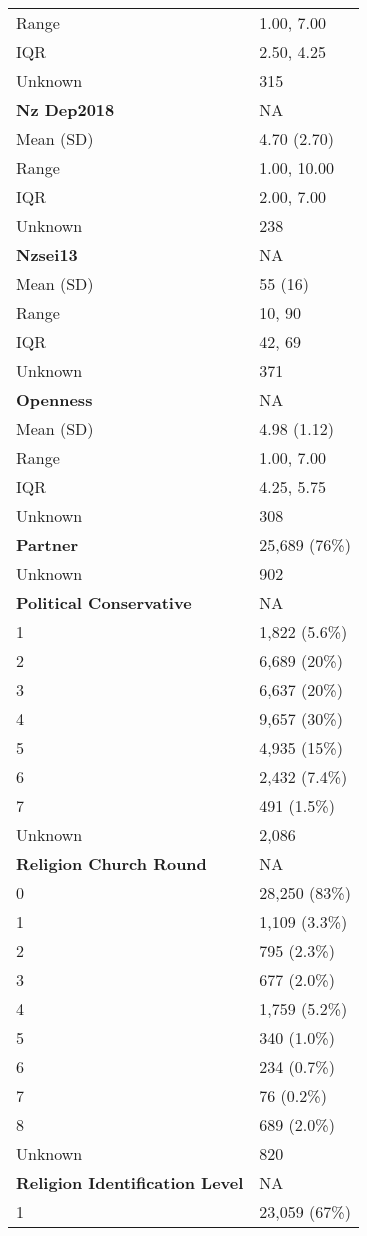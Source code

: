 \documentclass[
  single column]{article}
\begin{document}
\begin{longtable}[]{@{}ll@{}}
Range & 1.00, 7.00 \\
IQR & 2.50, 4.25 \\
Unknown & 315 \\
\textbf{Nz Dep2018} & NA \\
Mean (SD) & 4.70 (2.70) \\
Range & 1.00, 10.00 \\
IQR & 2.00, 7.00 \\
Unknown & 238 \\
\textbf{Nzsei13} & NA \\
Mean (SD) & 55 (16) \\
Range & 10, 90 \\
IQR & 42, 69 \\
Unknown & 371 \\
\textbf{Openness} & NA \\
Mean (SD) & 4.98 (1.12) \\
Range & 1.00, 7.00 \\
IQR & 4.25, 5.75 \\
Unknown & 308 \\
\textbf{Partner} & 25,689 (76\%) \\
Unknown & 902 \\
\textbf{Political Conservative} & NA \\
1 & 1,822 (5.6\%) \\
2 & 6,689 (20\%) \\
3 & 6,637 (20\%) \\
4 & 9,657 (30\%) \\
5 & 4,935 (15\%) \\
6 & 2,432 (7.4\%) \\
7 & 491 (1.5\%) \\
Unknown & 2,086 \\
\textbf{Religion Church Round} & NA \\
0 & 28,250 (83\%) \\
1 & 1,109 (3.3\%) \\
2 & 795 (2.3\%) \\
3 & 677 (2.0\%) \\
4 & 1,759 (5.2\%) \\
5 & 340 (1.0\%) \\
6 & 234 (0.7\%) \\
7 & 76 (0.2\%) \\
8 & 689 (2.0\%) \\
Unknown & 820 \\
\textbf{Religion Identification Level} & NA \\
1 & 23,059 (67\%) \\

\end{longtable}
\end{document}
